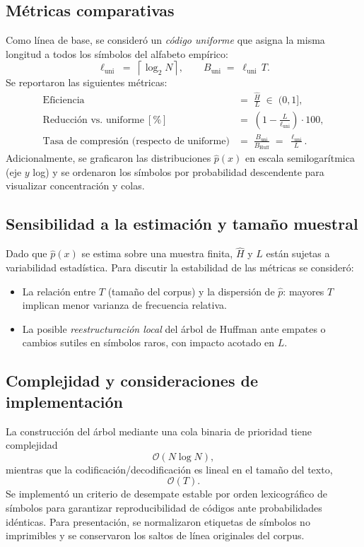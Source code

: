 \documentclass[12pt, a4paper]{article}
\begin{document}
\subsection*{Métricas comparativas}
Como línea de base, se consideró un \emph{código uniforme} que asigna la misma longitud a todos los símbolos del alfabeto empírico:
\[
\ell_{\text{uni}} \;=\; \left\lceil \log_2 N \right\rceil, 
\qquad
B_{\text{uni}} \;=\; \ell_{\text{uni}} \, T.
\]
Se reportaron las siguientes métricas:
\begin{align*}
\text{Eficiencia} 
&=\; \frac{\hat H}{L} \;\in\; (0,1],\\[4pt]
\text{Reducción vs.\ uniforme}~[\%]
&=\; \left( 1 - \frac{L}{\ell_{\text{uni}}} \right)\cdot 100,\\[4pt]
\text{Tasa de compresión (respecto de uniforme)}
&=\; \frac{B_{\text{uni}}}{B_{\text{Huff}}}
\;=\; \frac{\ell_{\text{uni}}}{L}.
\end{align*}
Adicionalmente, se graficaron las distribuciones $\hat p(x)$ en escala semilogarítmica (eje $y$ log) y se ordenaron los símbolos por probabilidad descendente para visualizar concentración y colas.

\subsection*{Sensibilidad a la estimación y tamaño muestral}
Dado que $\hat p(x)$ se estima sobre una muestra finita, $\hat H$ y $L$ están sujetas a variabilidad estadística. Para discutir la estabilidad de las métricas se consideró:
\begin{itemize}
  \item La relación entre $T$ (tamaño del corpus) y la dispersión de $\hat p$: mayores $T$ implican menor varianza de frecuencia relativa.
  \item La posible \emph{reestructuración local} del árbol de Huffman ante empates o cambios sutiles en símbolos raros, con impacto acotado en $L$.
\end{itemize}

\subsection*{Complejidad y consideraciones de implementación}
La construcción del árbol mediante una cola binaria de prioridad tiene complejidad
\[
\mathcal{O}(N \log N),
\]
mientras que la codificación/decodificación es lineal en el tamaño del texto,
\[
\mathcal{O}(T).
\]
Se implementó un criterio de desempate estable por orden lexicográfico de símbolos para garantizar reproducibilidad de códigos ante probabilidades idénticas. 
Para presentación, se normalizaron etiquetas de símbolos no imprimibles y se conservaron los saltos de línea originales del corpus.
\end{document}
